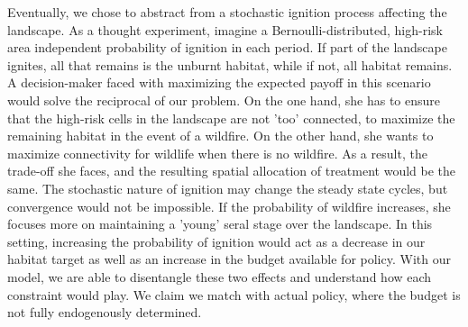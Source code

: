 Eventually, we chose to abstract from a stochastic ignition process affecting the landscape. As a thought experiment, imagine a Bernoulli-distributed, high-risk area independent probability of ignition in each period. If part of the landscape ignites, all that remains is the unburnt habitat, while if not, all habitat remains. A decision-maker faced with maximizing the expected payoff in this scenario would solve the reciprocal of our problem. On the one hand, she has to ensure that the high-risk cells in the landscape are not 'too' connected, to maximize the remaining habitat in the event of a wildfire. On the other hand, she wants to maximize connectivity for wildlife when there is no wildfire. As a result, the trade-off she faces, and the resulting spatial allocation of treatment would be the same. The stochastic nature of ignition may change the steady state cycles, but convergence would not be impossible. If the probability of wildfire increases, she focuses more on maintaining a 'young' seral stage over the landscape. In this setting, increasing the probability of ignition would act as a decrease in our habitat target as well as an increase in the budget available for policy. With our model, we are able to disentangle these two effects and understand how each constraint would play. We claim we match with actual policy, where the budget is not fully endogenously determined.


